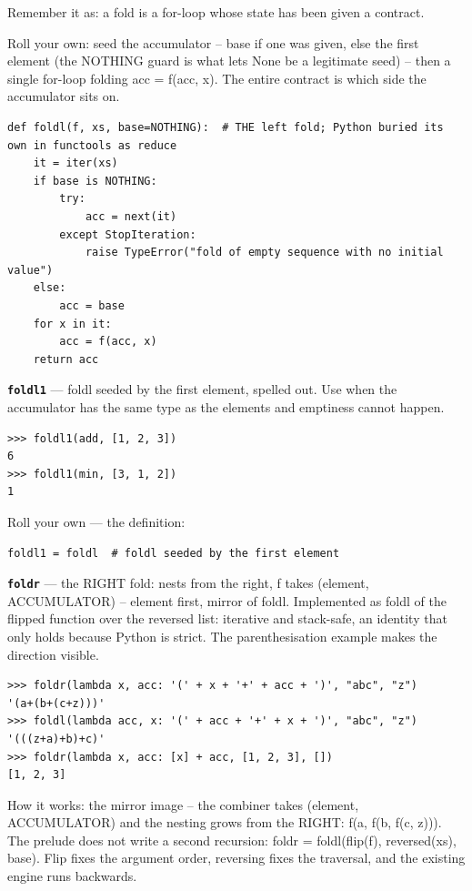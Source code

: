 \documentclass[10pt,letterpaper]{article}
\begin{document}
Remember it as: a fold is a for-loop whose state has been given a contract.


Roll your own: seed the accumulator -- base if one was given, else the first element (the NOTHING guard is what lets None be a legitimate seed) -- then a single for-loop folding acc = f(acc, x). The entire contract is which side the accumulator sits on.

\begin{lstlisting}[style=ex]
def foldl(f, xs, base=NOTHING):  # THE left fold; Python buried its own in functools as reduce
    it = iter(xs)
    if base is NOTHING:
        try:
            acc = next(it)
        except StopIteration:
            raise TypeError("fold of empty sequence with no initial value")
    else:
        acc = base
    for x in it:
        acc = f(acc, x)
    return acc
\end{lstlisting}
\textbf{\texttt{foldl1}} --- foldl seeded by the first element, spelled out. Use when the accumulator has the same type as the elements and emptiness cannot happen.
\begin{lstlisting}[style=ex]
>>> foldl1(add, [1, 2, 3])
6
>>> foldl1(min, [3, 1, 2])
1
\end{lstlisting}

Roll your own --- the definition:

\begin{lstlisting}[style=ex]
foldl1 = foldl  # foldl seeded by the first element
\end{lstlisting}
\textbf{\texttt{foldr}} --- the RIGHT fold: nests from the right, f takes (element, ACCUMULATOR) -- element first, mirror of foldl. Implemented as foldl of the flipped function over the reversed list: iterative and stack-safe, an identity that only holds because Python is strict. The parenthesisation example makes the direction visible.
\begin{lstlisting}[style=ex]
>>> foldr(lambda x, acc: '(' + x + '+' + acc + ')', "abc", "z")
'(a+(b+(c+z)))'
>>> foldl(lambda acc, x: '(' + acc + '+' + x + ')', "abc", "z")
'(((z+a)+b)+c)'
>>> foldr(lambda x, acc: [x] + acc, [1, 2, 3], [])
[1, 2, 3]
\end{lstlisting}

How it works: the mirror image -- the combiner takes (element, ACCUMULATOR) and the nesting grows from the RIGHT: f(a, f(b, f(c, z))). The prelude does not write a second recursion: foldr = foldl(flip(f), reversed(xs), base). Flip fixes the argument order, reversing fixes the traversal, and the existing engine runs backwards.
\end{document}
